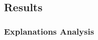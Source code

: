 \documentclass[english]{tktltiki2}
\theoremstyle{definition}
\theoremstyle{remark}
\begin{document}
%

\subsection{Results}
\subsubsection{Explanations Analysis}
\end{document}
